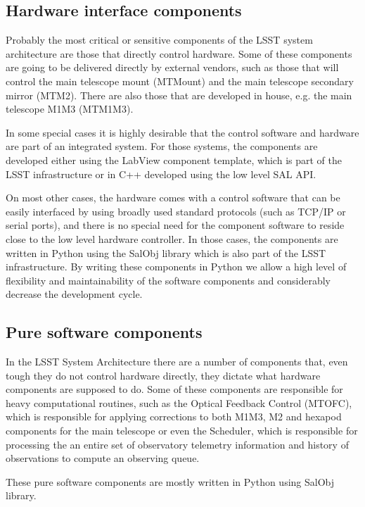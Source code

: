 \subsection{Hardware interface components}\label{sect:hardware_csc}
Probably the most critical or sensitive components of the LSST system architecture are those that directly control hardware. Some of these components are going to be delivered directly by external vendors, such as those that will control the main telescope mount (MTMount) and the main telescope secondary mirror (MTM2). There are also those that are developed in house, e.g. the main telescope M1M3 (MTM1M3). 

In some special cases it is highly desirable that the control software and hardware are part of an integrated system. For those systems, the components are developed either using the LabView component template, which is part of the LSST infrastructure or in C++ developed using the low level SAL API. 

On most other cases, the hardware comes with a control software that can be easily interfaced by using broadly used standard protocols (such as TCP/IP or serial ports), and there is no special need for the component software to reside close to the low level hardware controller. In those cases, the components are written in Python using the SalObj library which is also part of the LSST infrastructure. By writing these components in Python we allow a high level of flexibility and maintainability of the software components and considerably decrease the development cycle. 

\subsection{Pure software components}\label{sect:software_csc}
In the LSST System Architecture there are a number of components that, even tough they do not control hardware directly, they dictate what hardware components are supposed to do. Some of these components are responsible for heavy computational routines, such as the Optical Feedback Control (MTOFC), which is responsible for applying corrections to both M1M3, M2 and hexapod components for the main telescope or even the Scheduler, which is responsible for processing the an entire set of observatory telemetry information and history of observations to compute an observing queue. 

These pure software components are mostly written in Python using SalObj library. 

